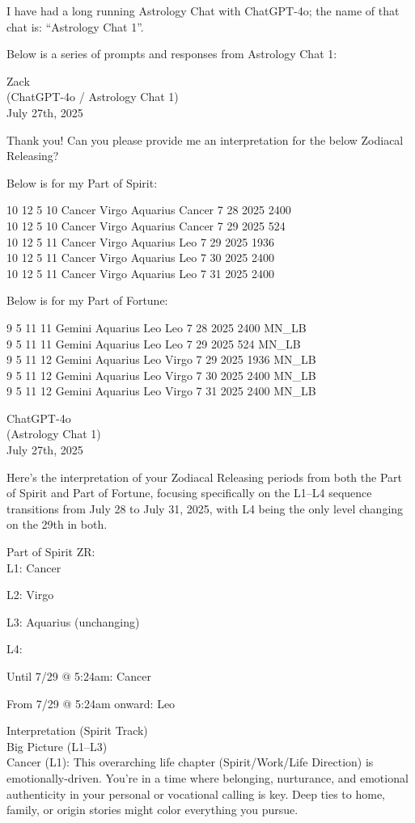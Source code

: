 \documentclass{article}
\begin{document}
I have had a long running Astrology Chat with ChatGPT-4o; the name of that chat is: ``Astrology Chat 1''.

Below is a series of prompts and responses from Astrology Chat 1:

Zack\\
(ChatGPT-4o / Astrology Chat 1)\\
July 27th, 2025

Thank you! Can you please provide me an interpretation for the below Zodiacal Releasing?

Below is for my Part of Spirit:

10 12 5 10 Cancer Virgo Aquarius Cancer 7 28 2025 2400\\
10 12 5 10 Cancer Virgo Aquarius Cancer 7 29 2025 524\\
10 12 5 11 Cancer Virgo Aquarius Leo 7 29 2025 1936\\
10 12 5 11 Cancer Virgo Aquarius Leo 7 30 2025 2400\\
10 12 5 11 Cancer Virgo Aquarius Leo 7 31 2025 2400

Below is for my Part of Fortune:

9 5 11 11 Gemini Aquarius Leo Leo 7 28 2025 2400 MN\_LB\\
9 5 11 11 Gemini Aquarius Leo Leo 7 29 2025 524 MN\_LB\\
9 5 11 12 Gemini Aquarius Leo Virgo 7 29 2025 1936 MN\_LB\\
9 5 11 12 Gemini Aquarius Leo Virgo 7 30 2025 2400 MN\_LB\\
9 5 11 12 Gemini Aquarius Leo Virgo 7 31 2025 2400 MN\_LB

ChatGPT-4o\\
(Astrology Chat 1)\\
July 27th, 2025

Here's the interpretation of your Zodiacal Releasing periods from both the Part of Spirit and Part of Fortune, focusing specifically on the L1--L4 sequence transitions from July 28 to July 31, 2025, with L4 being the only level changing on the 29th in both.

Part of Spirit ZR:\\
L1: Cancer

L2: Virgo

L3: Aquarius (unchanging)

L4:

Until 7/29 @ 5:24am: Cancer

From 7/29 @ 5:24am onward: Leo

Interpretation (Spirit Track)\\
Big Picture (L1--L3)\\
Cancer (L1): This overarching life chapter (Spirit/Work/Life Direction) is emotionally-driven. You're in a time where belonging, nurturance, and emotional authenticity in your personal or vocational calling is key. Deep ties to home, family, or origin stories might color everything you pursue.
\end{document}
